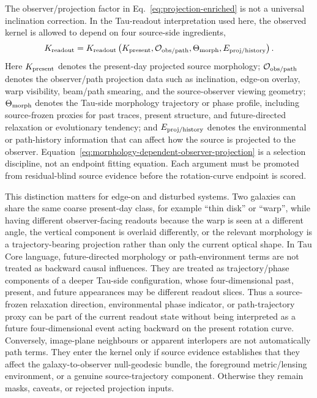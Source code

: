 \documentclass[11pt]{article}
\begin{document}
The observer/projection factor in Eq.~\eqref{eq:projection-enriched} is not a
universal inclination correction.  In the Tau-readout interpretation used here,
the observed kernel is allowed to depend on four source-side ingredients,
\begin{equation}
  K_{\rm readout}
  =
  K_{\rm readout}
  \left(
    K_{\rm present},
    {\cal O}_{\rm obs/path},
    \Theta_{\rm morph},
    E_{\rm proj/history}
  \right) .
  \label{eq:morphology-dependent-observer-projection}
\end{equation}
Here \(K_{\rm present}\) denotes the present-day projected source morphology;
\({\cal O}_{\rm obs/path}\) denotes the observer/path projection data such as
inclination, edge-on overlay, warp visibility, beam/path smearing, and the
source-observer viewing geometry; \(\Theta_{\rm morph}\) denotes the
Tau-side morphology trajectory or phase profile, including source-frozen
proxies for past traces, present structure, and future-directed relaxation or
evolutionary tendency; and \(E_{\rm proj/history}\) denotes the environmental
or path-history information that can affect how the source is projected to the
observer.  Equation~\eqref{eq:morphology-dependent-observer-projection}
is a selection discipline, not an endpoint fitting equation.  Each argument
must be promoted from residual-blind source evidence before the rotation-curve
endpoint is scored.

This distinction matters for edge-on and disturbed systems.  Two galaxies can
share the same coarse present-day class, for example ``thin disk'' or
``warp'', while having different observer-facing readouts because the warp is
seen at a different angle, the vertical component is overlaid differently, or
the relevant morphology is a trajectory-bearing projection rather than only the
current optical shape.  In Tau Core language, future-directed morphology or
path-environment terms are not treated as backward causal influences.  They are
treated as trajectory/phase components of a deeper Tau-side configuration,
whose four-dimensional past, present, and future appearances may be different
readout slices.  Thus a source-frozen relaxation direction, environmental phase
indicator, or path-trajectory proxy can be part of the current readout state
without being interpreted as a future four-dimensional event acting backward on
the present rotation curve.  Conversely, image-plane neighbours or apparent
interlopers are not automatically path terms.  They enter the kernel only if
source evidence establishes that they affect the galaxy-to-observer
null-geodesic bundle, the foreground metric/lensing environment, or a genuine
source-trajectory component.  Otherwise they remain masks, caveats, or rejected
projection inputs.
\end{document}
